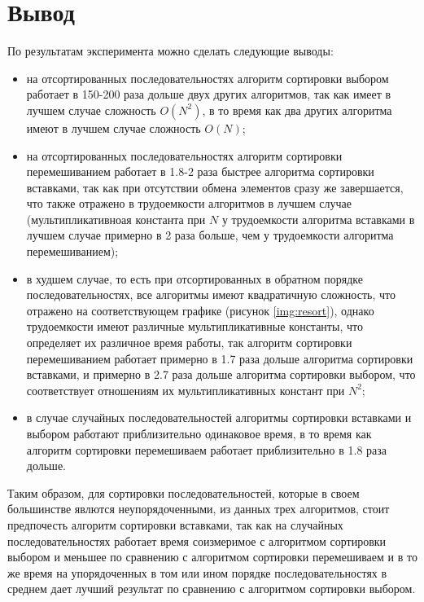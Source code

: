 \clearpage
\section{Вывод}

По результатам эксперимента можно сделать следующие выводы:
\begin{itemize}[left=\parindent]
    \item на отсортированных последовательностях алгоритм сортировки выбором
        работает в 150-200 раза дольше двух других алгоритмов, так как имеет в
        лучшем случае сложность $O(N^2)$, в то время как два других алгоритма
        имеют в лучшем случае сложность $O(N)$;
    \item на отсортированных последовательностях алгоритм сортировки
        перемешиванием работает в 1.8-2 раза быстрее алгоритма сортировки
        вставками, так как при отсутствии обмена элементов сразу же
        завершается, что также отражено в трудоемкости алгоритмов в лучшем
        случае (мультипликативноая константа при $N$ у трудоемкости алгоритма
        вставками в лучшем случае примерно в 2 раза больше, чем у трудоемкости
        алгоритма перемешиванием);
    \item в худшем случае, то есть при отсортированных в обратном порядке
        последовательностях, все алгоритмы имеют квадратичную сложность, что
        отражено на соответствующем графике (рисунок \ref{img:resort}), однако
        трудоемкости имеют различные мультипликативные константы, что
        определяет их различное время работы, так алгоритм сортировки
        перемешиванием работает примерно в 1.7 раза дольше алгоритма сортировки
        вставками, и примерно в 2.7 раза дольше алгоритма сортировки выбором,
        что соответствует отношениям их мультипликативных констант при $N^2$;
    \item в случае случайных последовательностей алгоритмы сортировки вставками
        и выбором работают приблизительно одинаковое время, в то время как
        алгоритм сортировки перемешиваем работает приблизительно в 1.8 раза
        дольше.
\end{itemize}

Таким образом, для сортировки последовательностей, которые в своем большинстве
явлются неупорядоченными, из данных трех алгоритмов, стоит предпочесть алгоритм
сортировки вставками, так как на случайных последовательностях работает время
соизмеримое с алгоритмом сортировки выбором и меньшее по сравнению с алгоритмом
сортировки перемешиваем и в то же время на упорядоченных в том или ином порядке
последовательностях в среднем дает лучший результат по сравнению с алгоритмом
сортировки выбором.
